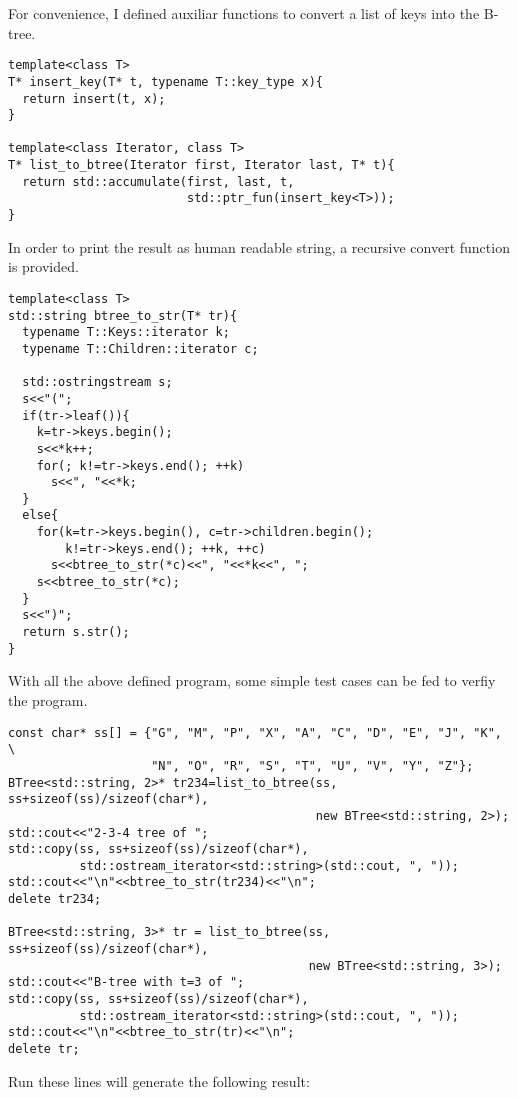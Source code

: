 \documentclass{article}
\begin{document}
For convenience, I defined auxiliar functions to convert a
list of keys into the B-tree.

\begin{lstlisting}
template<class T>
T* insert_key(T* t, typename T::key_type x){
  return insert(t, x);
}

template<class Iterator, class T>
T* list_to_btree(Iterator first, Iterator last, T* t){
  return std::accumulate(first, last, t,
                         std::ptr_fun(insert_key<T>));
}
\end{lstlisting}

In order to print the result as human readable string, a recursive
convert function is provided.

\begin{lstlisting}
template<class T>
std::string btree_to_str(T* tr){
  typename T::Keys::iterator k;
  typename T::Children::iterator c;

  std::ostringstream s;
  s<<"(";
  if(tr->leaf()){
    k=tr->keys.begin();
    s<<*k++;
    for(; k!=tr->keys.end(); ++k)
      s<<", "<<*k;
  }
  else{
    for(k=tr->keys.begin(), c=tr->children.begin();
        k!=tr->keys.end(); ++k, ++c)
      s<<btree_to_str(*c)<<", "<<*k<<", ";
    s<<btree_to_str(*c);
  }
  s<<")";
  return s.str();
}
\end{lstlisting}

With all the above defined program, some simple test cases can be
fed to verfiy the program.

\begin{lstlisting}
const char* ss[] = {"G", "M", "P", "X", "A", "C", "D", "E", "J", "K", \
                    "N", "O", "R", "S", "T", "U", "V", "Y", "Z"};
BTree<std::string, 2>* tr234=list_to_btree(ss, ss+sizeof(ss)/sizeof(char*),
                                           new BTree<std::string, 2>);
std::cout<<"2-3-4 tree of ";
std::copy(ss, ss+sizeof(ss)/sizeof(char*), 
          std::ostream_iterator<std::string>(std::cout, ", "));
std::cout<<"\n"<<btree_to_str(tr234)<<"\n";
delete tr234;

BTree<std::string, 3>* tr = list_to_btree(ss, ss+sizeof(ss)/sizeof(char*),
                                          new BTree<std::string, 3>);
std::cout<<"B-tree with t=3 of ";
std::copy(ss, ss+sizeof(ss)/sizeof(char*), 
          std::ostream_iterator<std::string>(std::cout, ", "));
std::cout<<"\n"<<btree_to_str(tr)<<"\n";
delete tr;
\end{lstlisting}

Run these lines will generate the following result:
\end{document}
